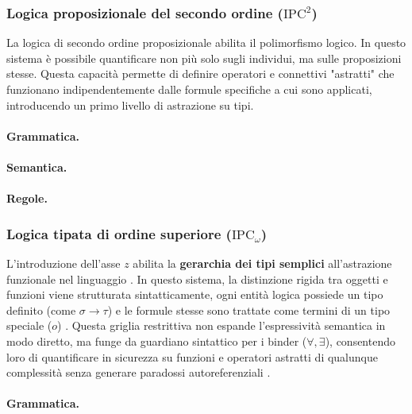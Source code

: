 \subsubsection{Logica proposizionale del secondo ordine (\texorpdfstring{$\text{IPC}^2$}{IPC2})}
La logica di secondo ordine proposizionale abilita il polimorfismo logico. In questo sistema è possibile quantificare non più solo sugli individui, ma sulle proposizioni stesse. 
Questa capacità permette di definire operatori e connettivi "astratti" che funzionano indipendentemente dalle formule specifiche a cui sono applicati, introducendo un primo livello 
di astrazione su tipi.

\paragraph{Grammatica.}


\paragraph{Semantica.}


\paragraph{Regole.} \breakpara


\subsubsection{Logica tipata di ordine superiore (\texorpdfstring{$\text{IPC}_\omega$}{IPCw})}
L'introduzione dell'asse $z$ abilita la \textbf{gerarchia dei tipi semplici} all'astrazione funzionale nel linguaggio \cite{hindley1997}. In questo sistema, la distinzione rigida tra oggetti 
e funzioni viene strutturata sintatticamente, ogni entità logica possiede un tipo definito (come $\sigma \to \tau$) e le formule stesse sono trattate come termini di un tipo speciale ($o$) 
\cite{hindley1997}. Questa griglia restrittiva non espande l'espressività semantica in modo diretto, ma funge da guardiano sintattico per i binder ($\forall, \exists$), consentendo loro di 
quantificare in sicurezza su funzioni e operatori astratti di qualunque complessità senza generare paradossi autoreferenziali \cite{hindley1997}.

\paragraph{Grammatica.}


